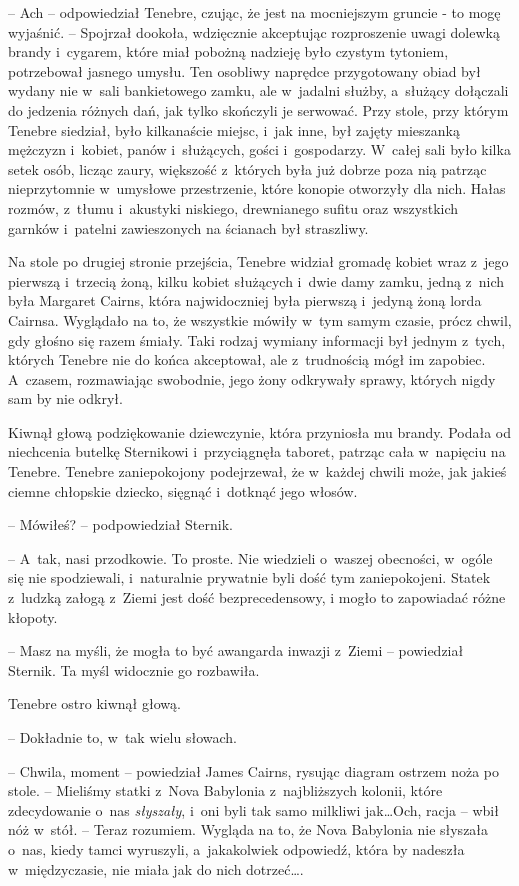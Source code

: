 \documentclass[oneside,polish,12pt,sfheadings]{mwbk}
\begin{document}
-- Ach -- odpowiedział Tenebre, czując, że jest na mocniejszym gruncie -
to mogę wyjaśnić. -- Spojrzał dookoła, wdzięcznie akceptując rozproszenie
uwagi dolewką brandy i~cygarem, które miał pobożną nadzieję było czystym
tytoniem, potrzebował jasnego umysłu. Ten osobliwy naprędce przygotowany
obiad był wydany nie w~sali bankietowego zamku, ale w~jadalni służby, a~służący dołączali do jedzenia różnych dań, jak tylko skończyli je
serwować. Przy stole, przy którym Tenebre siedział, było kilkanaście
miejsc, i~jak inne, był zajęty mieszanką mężczyzn i~kobiet, panów i~służących, gości i~gospodarzy. W~całej sali było kilka setek osób,
licząc zaury, większość z~których była już dobrze poza nią patrząc
nieprzytomnie w~umysłowe przestrzenie, które konopie otworzyły dla nich.
Hałas rozmów, z~tłumu i~akustyki niskiego, drewnianego sufitu oraz
wszystkich garnków i~patelni zawieszonych na ścianach był straszliwy.

Na stole po drugiej stronie przejścia, Tenebre widział gromadę kobiet
wraz z~jego pierwszą i~trzecią żoną, kilku kobiet służących i~dwie damy
zamku, jedną z~nich była Margaret Cairns, która najwidoczniej była
pierwszą i~jedyną żoną lorda Cairnsa. Wyglądało na to, że wszystkie
mówiły w~tym samym czasie, prócz chwil, gdy głośno się razem śmiały.
Taki rodzaj wymiany informacji był jednym z~tych, których Tenebre nie do
końca akceptował, ale z~trudnością mógł im zapobiec. A~czasem,
rozmawiając swobodnie, jego żony odkrywały sprawy, których nigdy sam by
nie odkrył.

Kiwnął głową podziękowanie dziewczynie, która przyniosła mu brandy.
Podała od niechcenia butelkę Sternikowi i~przyciągnęła taboret, patrząc
cała w~napięciu na Tenebre. Tenebre zaniepokojony podejrzewał, że w~każdej chwili może, jak jakieś ciemne chłopskie dziecko, sięgnąć i~dotknąć jego włosów.

-- Mówiłeś? -- podpowiedział Sternik.

-- A~tak, nasi przodkowie. To proste. Nie wiedzieli o~waszej obecności, w~ogóle się nie spodziewali, i~naturalnie prywatnie byli dość tym
zaniepokojeni. Statek z~ludzką załogą z~Ziemi jest dość bezprecedensowy,
i mogło to zapowiadać różne kłopoty.

-- Masz na myśli, że mogła to być awangarda inwazji z~Ziemi -- powiedział
Sternik. Ta myśl widocznie go rozbawiła.

Tenebre ostro kiwnął głową. 

-- Dokładnie to, w~tak wielu słowach.

-- Chwila, moment -- powiedział James Cairns, rysując diagram ostrzem noża
po stole. -- Mieliśmy statki z~Nova Babylonia z~najbliższych kolonii,
które zdecydowanie o~nas \emph{słyszały}, i~oni byli tak samo milkliwi
jak\ldots Och, racja -- wbił nóż w~stół. -- Teraz rozumiem. Wygląda na to, że
Nova Babylonia nie słyszała o~nas, kiedy tamci wyruszyli, a~jakakolwiek
odpowiedź, która by nadeszła w~międzyczasie, nie miała jak do nich
dotrzeć\ldots .
\end{document}
